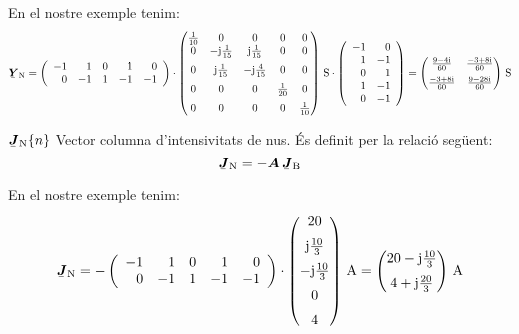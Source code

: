 \begin{list}{}
   En el nostre exemple tenim:
   {\fontsize{10pt}{10pt}\selectfont
   \[
      \mcmplx{Y}\ped{N} =
      \left(\begin{array}{rrrrr} -1 & 1  & 0 &  1 & 0 \\  0 & -1 & 1 & -1 & -1
      \end{array}\right) \cdot
      \begin{pmatrix}
            \frac{1}{10} & 0 & 0 & 0 & 0 \\
            0 & -\ju\frac{1}{15} & \ju\frac{1}{15} & 0 & 0 \\[2mm]
            0 & \ju\frac{1}{15} & -\ju\frac{4}{15} & 0 & 0 \\[2mm]
            0 & 0 & 0 & \frac{1}{20} & 0 \\[2mm]
            0 & 0 & 0 & 0 & \frac{1}{10}
      \end{pmatrix}\,\unit{S} \cdot
      \left(\begin{array}{rr} -1 & 0 \\ 1  & -1 \\  0 & 1 \\ 1 & -1 \\ 0 & -1
      \end{array}\right)
       =
      \begin{pmatrix}
            \frac{\complexnum{9 - j 4}}{60} & \frac{\complexnum{-3 + j 8}}{60} \\[2mm]
            \frac{\complexnum{-3 + j 8}}{60} & \frac{\complexnum{9 - j 28}}{60}
      \end{pmatrix}\,\unit{S}
      \label{eq:yn}
   \]}

   \item[$\mcmplx{J}\ped{N}\{n\}$] Vector columna d'intensivitats de nus. És definit per la relació següent:
   \begin{equation}
      \mcmplx{J}\ped{N} = - \boldsymbol{A} \,\mcmplx{J}\ped{B}
   \end{equation}

   En el nostre exemple tenim:
   \[
      \mcmplx{J}\ped{N} = -
      \left(\begin{array}{rrrrr} -1 & 1  & 0 &  1 & 0 \\  0 & -1 & 1 & -1 & -1
      \end{array}\right) \cdot
      \begin{pmatrix}
            20 \\[2mm]
             \ju \frac{10}{3} \\[2mm]
             -\ju \frac{10}{3} \\[2mm]
             0 \\[2mm]
              4
      \end{pmatrix}\,\unit{A}
      =
      \begin{pmatrix}
            20 - \ju \frac{10}{3} \\[2mm]
            4 + \ju \frac{20}{3}
      \end{pmatrix}\unit{\,A}
   \]


\end{list}
